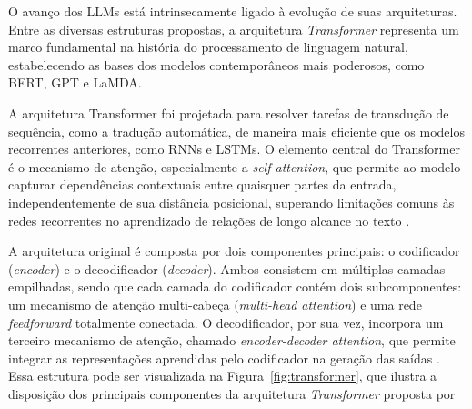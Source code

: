 O avanço dos LLMs está intrinsecamente ligado à evolução de suas arquiteturas. Entre as diversas estruturas propostas, a arquitetura \textit{Transformer} representa um marco fundamental na história do processamento de linguagem natural, estabelecendo as bases dos modelos contemporâneos mais poderosos, como BERT, GPT e LaMDA.

A arquitetura Transformer foi projetada para resolver tarefas de transdução de sequência, como a tradução automática, de maneira mais eficiente que os modelos recorrentes anteriores, como RNNs e LSTMs. O elemento central do Transformer é o mecanismo de atenção, especialmente a \textit{self-attention}, que permite ao modelo capturar dependências contextuais entre quaisquer partes da entrada, independentemente de sua distância posicional, superando limitações comuns às redes recorrentes no aprendizado de relações de longo alcance no texto \cite{vaswani2017}.

A arquitetura original é composta por dois componentes principais: o codificador (\textit{encoder}) e o decodificador (\textit{decoder}). Ambos consistem em múltiplas camadas empilhadas, sendo que cada camada do codificador contém dois subcomponentes: um mecanismo de atenção multi-cabeça (\textit{multi-head attention}) e uma rede \textit{feedforward} totalmente conectada. O decodificador, por sua vez, incorpora um terceiro mecanismo de atenção, chamado \textit{encoder-decoder attention}, que permite integrar as representações aprendidas pelo codificador na geração das saídas \cite{ankit2024transformer}.  Essa estrutura pode ser visualizada na Figura~\ref{fig:transformer}, que ilustra a disposição dos principais componentes da arquitetura \textit{Transformer} proposta por 

